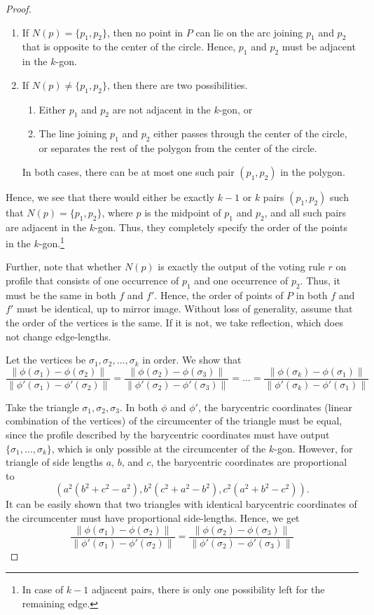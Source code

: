 \documentclass[10pt,letterpaper]{article}
\begin{document}
\begin{proof}
\begin{enumerate}
\item If $N(p) = \{p_1,p_2\}$, then no point in $P$ can lie on the arc joining $p_1$ and $p_2$ that is opposite to the center of the circle. Hence, $p_1$ and $p_2$ must be adjacent in the $k$-gon.  
\item If $N(p) \neq \{p_1,p_2\}$, then there are two possibilities.
\begin{enumerate}
\item Either $p_1$ and $p_2$ are not adjacent in the $k$-gon, or
\item The line joining $p_1$ and $p_2$ either passes through the center of the circle, or separates the rest of the polygon from the center of the circle. 
\end{enumerate}
In both cases, there can be at most one such pair $(p_1,p_2)$ in the polygon.
\end{enumerate}

Hence, we see that there would either be exactly $k-1$ or $k$ pairs $(p_1,p_2)$ such that $N(p) = \{p_1,p_2\}$, where $p$ is the midpoint of $p_1$ and $p_2$, and all such pairs are adjacent in the $k$-gon. Thus, they completely specify the order of the points in the $k$-gon.\footnote{In case of $k-1$ adjacent pairs, there is only one possibility left for the remaining edge.} 

Further, note that whether $N(p)$ is exactly the output of the voting rule $r$ on profile that consists of one occurrence of $p_1$ and one occurrence of $p_2$. Thus, it must be the same in both $f$ and $f'$. Hence, the order of points of $P$ in both $f$ and $f'$ must be identical, up to mirror image. Without loss of generality, assume that the order of the vertices is the same. If it is not, we take reflection, which does not change edge-lengths. 

Let the vertices be $\sigma_1, \sigma_2, \ldots, \sigma_k$ in order. We show that
\begin{equation}
\frac{\|\phi(\sigma_1)-\phi(\sigma_2)\|}{\|\phi'(\sigma_1)-\phi'(\sigma_2)\|} = \frac{\|\phi(\sigma_2)-\phi(\sigma_3)\|}{\|\phi'(\sigma_2)-\phi'(\sigma_3)\|} = \ldots = \frac{\|\phi(\sigma_k)-\phi(\sigma_1)\|}{\|\phi'(\sigma_k)-\phi'(\sigma_1)\|}
\label{eqn:polygon-condn}
\end{equation}

Take the triangle $\sigma_1, \sigma_2, \sigma_3$. In both $\phi$ and $\phi'$, the barycentric coordinates (linear combination of the vertices) of the circumcenter of the triangle must be equal, since the profile described by the barycentric coordinates must have output $\{\sigma_1,\ldots,\sigma_k\}$, which is only possible at the circumcenter of the $k$-gon. However, for triangle of side lengths $a$, $b$, and $c$, the barycentric coordinates are proportional to 
$$
(a^2 (b^2+c^2-a^2), b^2 (c^2+a^2-b^2), c^2 (a^2+b^2-c^2)).
$$
It can be easily shown that two triangles with identical barycentric coordinates of the circumcenter must have proportional side-lengths. Hence, we get 
$$
\frac{\|\phi(\sigma_1)-\phi(\sigma_2)\|}{\|\phi'(\sigma_1)-\phi'(\sigma_2)\|} = \frac{\|\phi(\sigma_2)-\phi(\sigma_3)\|}{\|\phi'(\sigma_2)-\phi'(\sigma_3)\|}
$$


\end{proof}
\end{document}
